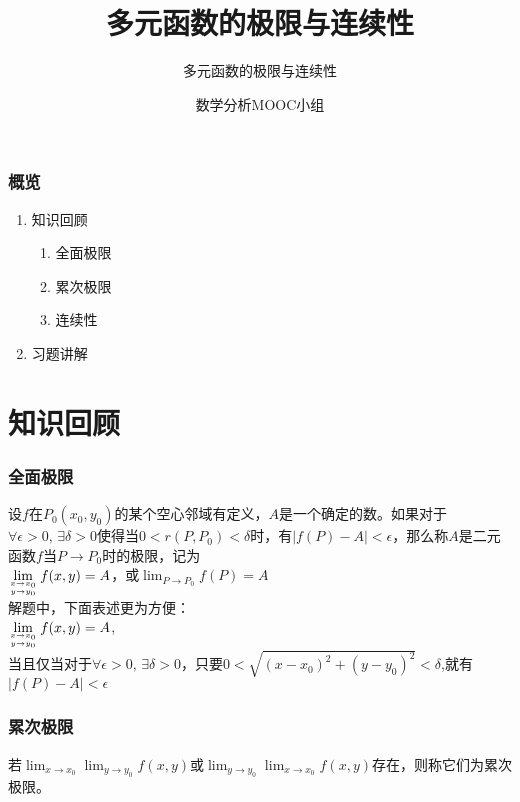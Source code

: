 \documentclass[xetex]{beamer}
\title{多元函数的极限与连续性}
\subtitle{多元函数的极限与连续性}
\author{数学分析MOOC小组 }
\date{}
\begin{document}
\frame{\maketitle}

\begin{frame}
    \frametitle{概览}
	
    \begin{enumerate}
        \item 知识回顾
			\begin{enumerate}
           \item 全面极限
			\item 累次极限
			\item 连续性 
        	\end{enumerate}
        \item 习题讲解
        
    \end{enumerate}


\end{frame}

\section{知识回顾}
\begin{frame}
    \frametitle{全面极限} 
  设$f$在$P_{0}(x_{0},y_{0})$的某个空心邻域有定义，$A$是一个确定的数。如果对于$\forall \epsilon >0,\,\exists \delta>0$使得当$0<r(P,P_{0})<\delta$时，有$|f(P)-A|<\epsilon$，那么称$A$是二元函数$f$当$P\to P_{0}$时的极限，记为\\ $\displaystyle\lim_{x \to x_{0}\atop y \to y_{0}}f(x,y)=A$，或$\displaystyle\lim_{P \to P_{0}}f(P)=A$
\\解题中，下面表述\alert{更为方便}：\\
$\displaystyle\lim_{x \to x_{0}\atop y \to y_{0}}f(x,y)=A$,\\当且仅当对于$\forall\epsilon >0,\,\exists \delta>0$，只要$0<\sqrt{(x-x_{0})^2 + (y-y_{0})^2}<\delta$,就有$|f(P)-A|<\epsilon$
	
	
\end{frame}

\begin{frame}
    \frametitle{累次极限} 
   
若$\displaystyle\lim_{x \to x_{0}}\lim_{y \to y_{0}}f(x,y)$或$\displaystyle\lim_{y \to y_{0}}\lim_{x \to x_{0}}f(x,y)$存在，则称它们为累次极限。
	 
\end{frame}
 
\end{document}
